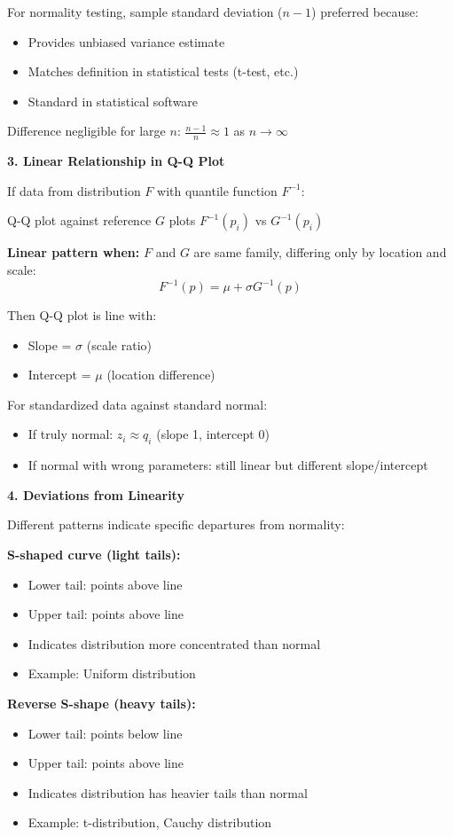 \documentclass[12pt]{article}
\begin{document}
\begin{explanation}
For normality testing, sample standard deviation ($n-1$) preferred because:
\begin{itemize}
\item Provides unbiased variance estimate
\item Matches definition in statistical tests (t-test, etc.)
\item Standard in statistical software
\end{itemize}

Difference negligible for large $n$: $\frac{n-1}{n} \approx 1$ as $n \to \infty$

\textbf{3. Linear Relationship in Q-Q Plot}

If data from distribution $F$ with quantile function $F^{-1}$:

Q-Q plot against reference $G$ plots $F^{-1}(p_i)$ vs $G^{-1}(p_i)$

\textbf{Linear pattern when:} $F$ and $G$ are same family, differing only by location and scale:
\[F^{-1}(p) = \mu + \sigma G^{-1}(p)\]

Then Q-Q plot is line with:
\begin{itemize}
\item Slope = $\sigma$ (scale ratio)
\item Intercept = $\mu$ (location difference)
\end{itemize}

For standardized data against standard normal:
\begin{itemize}
\item If truly normal: $z_i \approx q_i$ (slope 1, intercept 0)
\item If normal with wrong parameters: still linear but different slope/intercept
\end{itemize}

\textbf{4. Deviations from Linearity}

Different patterns indicate specific departures from normality:

\textbf{S-shaped curve (light tails):}
\begin{itemize}
\item Lower tail: points above line
\item Upper tail: points above line
\item Indicates distribution more concentrated than normal
\item Example: Uniform distribution
\end{itemize}

\textbf{Reverse S-shape (heavy tails):}
\begin{itemize}
\item Lower tail: points below line
\item Upper tail: points above line
\item Indicates distribution has heavier tails than normal
\item Example: t-distribution, Cauchy distribution
\end{itemize}


\end{explanation}
\end{document}
